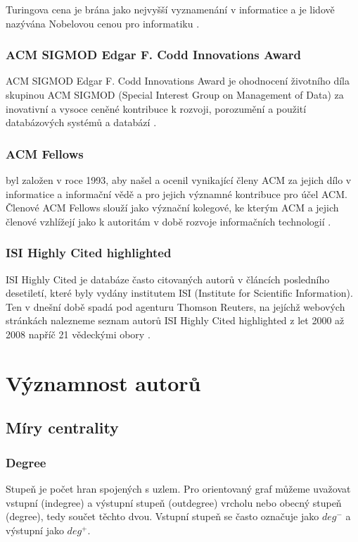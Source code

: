 \documentclass[12pt,titlepage]{report}
\begin{document}
Turingova cena je brána jako nejvyšší vyznamenání v informatice a je lidově
nazývána Nobelovou cenou pro informatiku \cite[p.~317]{dasgupta}.

\subsection{ACM SIGMOD Edgar F. Codd Innovations Award}
ACM SIGMOD Edgar F. Codd Innovations Award je ohodnocení životního díla
skupinou ACM SIGMOD (Special Interest Group on Management of Data)  za
inovativní a vysoce ceněné kontribuce k rozvoji, porozumění a použití
databázových systémů a databází \cite{sigmodinnovations}.

\subsection{ACM Fellows}
 byl založen v roce 1993, aby našel a ocenil
vynikající členy ACM za jejich dílo v informatice a informační vědě a pro
jejich významné kontribuce pro účel ACM. Členové ACM Fellows slouží jako
význační kolegové, ke kterým ACM a jejich členové vzhlížejí jako k autoritám v
době rozvoje informačních technologií \cite{acmfellows}.

\subsection{ISI Highly Cited highlighted}
ISI Highly Cited je databáze často citovaných autorů v článcích posledního
desetiletí, které byly vydány institutem ISI (Institute for Scientific
Information). Ten v dnešní době spadá pod agenturu Thomson Reuters, na jejíchž
webových stránkách nalezneme seznam autorů ISI Highly Cited highlighted z let
2000 až 2008 napříč 21 vědeckými obory \cite{highlycited}.

\chapter{Významnost autorů}
\section{Míry centrality}
\subsection{Degree}
Stupeň je počet hran spojených s uzlem. Pro orientovaný graf můžeme uvažovat
vstupní (indegree) a výstupní stupeň (outdegree) vrcholu nebo obecný stupeň
(degree), tedy součet těchto dvou.  Vstupní stupeň se často označuje jako
$deg^-$ a výstupní jako $deg^+$. 
\end{document}
